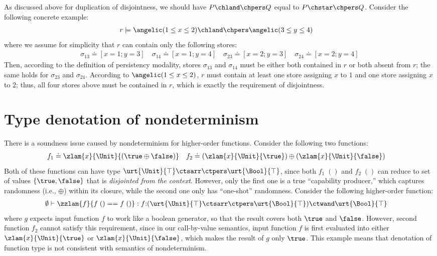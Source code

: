 \begin{example}[Persistency] As discussed above for duplication of disjointness, we should have $P \chland \chpers Q$ equal to $P \chstar \chpers Q$. Consider the following concrete example:
\begin{align*}
  &r \models \angelic (1 \leq x \leq 2) \chland \chpers \angelic (3 \leq y \leq 4)
\end{align*}\noindent
where we assume for simplicity that $r$ can contain only the following stores:
\begin{align*}
  \sigma_{13} \doteq [x=1; y=3] \quad \sigma_{14} \doteq [x=1; y=4] \quad \sigma_{23} \doteq [x=2; y=3] \quad \sigma_{24} \doteq [x=2; y=4]
\end{align*}\noindent
Then, according to the definition of persistency modality, stores $\sigma_{13}$ and $\sigma_{14}$ must be either both contained in $r$ or both absent from $r$; the same holds for $\sigma_{23}$ and $\sigma_{24}$. According to $\angelic (1 \leq x \leq 2)$, $r$ must contain at least one store assigning $x$ to $1$ and one store assigning $x$ to $2$; thus, all four stores above must be contained in $r$, which is exactly the requirement of disjointness.
\end{example}

\section{Type denotation of nondeterminism}

There is a soundness issue caused by nondeterminism for higher-order functions. Consider the following two functions:
\begin{align*}
  &f_1\doteq \zlam{x}{\Unit}{(\true \oplus \false)} \quad f_2\doteq (\zlam{x}{\Unit}{\true}) \oplus (\zlam{x}{\Unit}{\false})
\end{align*}\noindent
Both of these functions can have type $\urt{\Unit}{\top}\ctsarr\ctpers\urt{\Bool}{\top}$, since both $f_1\;()$ and $f_2\;()$ can reduce to set of values $\{\true, \false\}$ that is \emph{disjointed from the context}. However, only the first one is a true ``capability producer,'' which captures randomness (i.e., $\oplus$) within its closure, while the second one only has ``one-shot'' randomness. Consider the following higher-order function:
\begin{align*}
  &\emptyset \vdash \zzlam{f}{f\;() == f\;()} : f{:}(\urt{\Unit}{\top}\ctsarr\ctpers\urt{\Bool}{\top}) \ctwand \urt{\Bool}{\top}
\end{align*}\noindent
where $g$ expects input function $f$ to work like a boolean generator, so that the result covers both $\true$ and $\false$. However, second function $f_2$ cannot satisfy this requirement, since in our call-by-value semantics, input function $f$ is first evaluated into either $\zlam{x}{\Unit}{\true}$ or $\zlam{x}{\Unit}{\false}$, which makes the result of $g$ only $\true$. This example means that denotation of function type is not consistent with semantics of nondeterminism.

